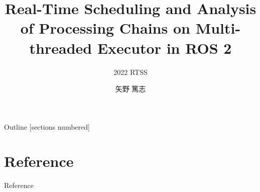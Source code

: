 \newcommand{\beamerDir}[0]{/mnt/c/Users/atsushi/Documents/workspace/env/Beamer/beamer/beamer/}





\newcommand{\forme}[1]{}


\title{Real-Time Scheduling and Analysis of Processing Chains on Multi-threaded Executor in ROS 2}
\subtitle{2022 RTSS}
\author{矢野 篤志}




\maketitle



\begin{frame}{Outline}
    [sections numbered]
    \tiny\tableofcontents[hideallsubsections]
\end{frame}











\lastpage

\section*{Reference}
\begin{frame}[allowframebreaks]{Reference}
    \beamertemplatetextbibitems
    
    
\end{frame}


